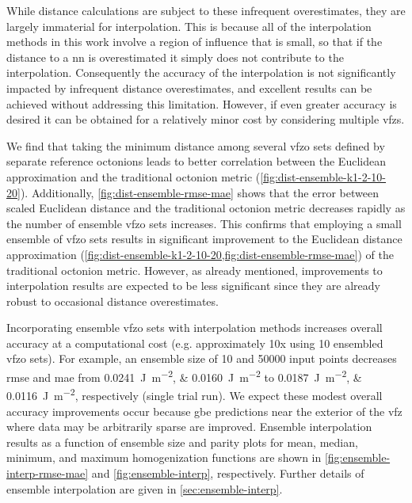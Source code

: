\documentclass[final,twocolumn,12pt]{elsarticle}
\newcommand{\inpt}{input}
\begin{document}
While distance calculations are subject to these infrequent overestimates, they are largely immaterial for interpolation. This is because all of the interpolation methods in this work involve a region of influence that is small, so that if the distance to a \gls{nn} is overestimated it simply does not contribute to the interpolation. Consequently the accuracy of the interpolation is not significantly impacted by infrequent distance overestimates, and excellent results can be achieved without addressing this limitation. However, if even greater accuracy is desired it can be obtained for a relatively minor cost by considering multiple \glspl{vfz}.

We find that taking the minimum distance among several \gls{vfzo} sets defined by separate reference octonions leads to better correlation between the Euclidean approximation and the traditional octonion metric (\cref{fig:dist-ensemble-k1-2-10-20}). Additionally, \cref{fig:dist-ensemble-rmse-mae} shows that the error between scaled Euclidean distance and the traditional octonion metric decreases rapidly as the number of ensemble \gls{vfzo} sets increases. This confirms that employing a small ensemble of \gls{vfzo} sets results in significant improvement to the Euclidean distance approximation (\cref{fig:dist-ensemble-k1-2-10-20,fig:dist-ensemble-rmse-mae}) of the traditional octonion metric. However, as already mentioned, improvements to interpolation results are expected to be less significant since they are already robust to occasional distance overestimates.

Incorporating ensemble \gls{vfzo} sets with interpolation methods increases overall accuracy at a computational cost (e.g. approximately 10x using 10 ensembled \gls{vfzo} sets). For example, an ensemble size of 10 and \num{50000} \inpt{} points decreases \gls{rmse} and \gls{mae} from \SIlist{0.0241;0.0160}{\J\per\square\m} to \SIlist{0.0187;0.0116}{\J\per\square\m}, respectively (single trial run). We expect these modest overall accuracy improvements occur because \gls{gbe} predictions near the exterior of the \gls{vfz} where data may be arbitrarily sparse are improved. Ensemble interpolation results as a function of ensemble size and parity plots for mean, median, minimum, and maximum homogenization functions are shown in \cref{fig:ensemble-interp-rmse-mae} and \cref{fig:ensemble-interp}, respectively. Further details of ensemble interpolation are given in \cref{sec:ensemble-interp}.
\end{document}

